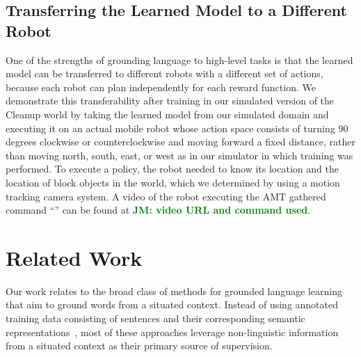 \documentclass[conference]{IEEEtran}
\newcommand{\jmnote}[1]{\textcolor{Green}{\textbf{JM: #1}}}
\begin{document}
\subsection{Transferring the Learned Model to a Different Robot}
One of the strengths of grounding language to high-level tasks is that the learned model can be transferred to different robots with a different set of actions, because each robot can plan independently for each reward function. We demonstrate this transferability after training in our simulated version of the Cleanup world by taking the learned model from our simulated domain and executing it on an actual mobile robot whose action space consists of turning 90 degrees clockwise or counterclockwise and moving forward a fixed distance, rather than moving north, south, east, or west as in our simulator in which training was performed. To execute a policy, the robot needed to know its location and the location of block objects in the world, which we determined by using a motion tracking camera system. A video of the robot executing the AMT gathered command ``'' can be found at \jmnote{video URL and command used}. 


\section{Related Work}
\label{s:rel_work}


Our work relates to the broad class of methods for grounded language learning that aim to ground words from a situated context.
Instead of using annotated training data consisting of sentences and their corresponding semantic representations~\cite{kate06,wong07,zettlemoyer05,zettlemoyer09}, 
most of these approaches leverage non-linguistic information from a situated context as their primary source of supervision. 
\end{document}
